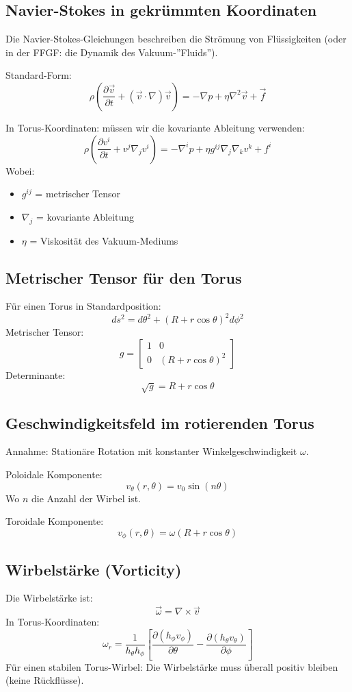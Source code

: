 	\subsection{Navier-Stokes in gekrümmten Koordinaten}
	Die Navier-Stokes-Gleichungen beschreiben die Strömung von Flüssigkeiten (oder in der FFGF: die Dynamik des Vakuum-''Fluids'').
	
	Standard-Form:
	\[
	\rho\left(\frac{\partial \vec{v}}{\partial t} + (\vec{v} \cdot \nabla) \vec{v}\right) = -\nabla p + \eta \nabla^2 \vec{v} + \vec{f}
	\]
	
	In Torus-Koordinaten: müssen wir die kovariante Ableitung verwenden:
	\[
	\rho\left(\frac{\partial v^i}{\partial t} + v^j \nabla_j v^i\right) = -\nabla^i p + \eta g^{ij} \nabla_j \nabla_k v^k + f^i
	\]
	Wobei:
	\begin{itemize}
		\item \( g^{ij} \) = metrischer Tensor
		\item \( \nabla_j \) = kovariante Ableitung
		\item \( \eta \) = Viskosität des Vakuum-Mediums
	\end{itemize}
	
	\subsection{Metrischer Tensor für den Torus}
	Für einen Torus in Standardposition:
	\[
	ds^2 = d\theta^2 + (R + r \cos \theta)^2 d\phi^2
	\]
	Metrischer Tensor:
	\[
	g = \begin{bmatrix}
		1 & 0 \\
		0 & (R + r \cos \theta)^2
	\end{bmatrix}
	\]
	Determinante:
	\[
	\sqrt{g} = R + r \cos \theta
	\]
	
	\subsection{Geschwindigkeitsfeld im rotierenden Torus}
	Annahme: Stationäre Rotation mit konstanter Winkelgeschwindigkeit \( \omega \).
	
	Poloidale Komponente:
	\[
	v_\theta(r, \theta) = v_0 \sin(n \theta)
	\]
	Wo \( n \) die Anzahl der Wirbel ist.
	
	Toroidale Komponente:
	\[
	v_\phi(r, \theta) = \omega (R + r \cos \theta)
	\]
	
	\subsection{Wirbelstärke (Vorticity)}
	Die Wirbelstärke ist:
	\[
	\vec{\omega} = \nabla \times \vec{v}
	\]
	In Torus-Koordinaten:
	\[
	\omega_r = \frac{1}{h_\theta h_\phi} \left[ \frac{\partial (h_\phi v_\phi)}{\partial \theta} - \frac{\partial (h_\theta v_\theta)}{\partial \phi} \right]
	\]
	Für einen stabilen Torus-Wirbel: Die Wirbelstärke muss überall positiv bleiben (keine Rückflüsse).
	
